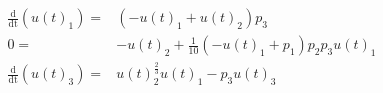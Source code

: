 \begin{align}
\mathrm{\frac{d}{d t}}\left( u(t)_1 \right) =& \left(  - u(t)_1 + u(t)_2 \right) p_3 \\
0 =&  - u(t)_2 + \frac{1}{10} \left(  - u(t)_1 + p_1 \right) p_2 p_3 u(t)_1 \\
\mathrm{\frac{d}{d t}}\left( u(t)_3 \right) =& u(t)_2^{\frac{2}{3}} u(t)_1 - p_3 u(t)_3
\end{align}
